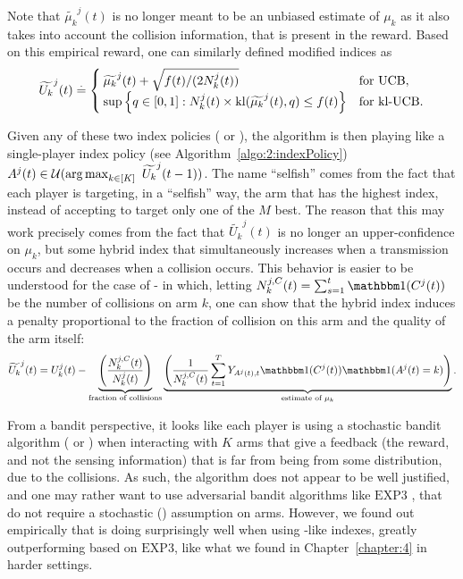 Note that $\widetilde{\mu_k}^j(t)$ is no longer meant to be an unbiased estimate of $\mu_k$ as it also takes into account the collision information, that is present in the reward. Based on this empirical reward, one can similarly defined modified indices as
%
\begin{equation}\label{eq:5:indexTilde}
  \widetilde{U_k}^j(t) \overset{.}{=} \begin{cases}
      \widetilde{\mu_k}^j(t)  + \sqrt{  f(t) / (2N_k^j(t))}
      &\text{for } \mathrm{UCB}, \\
      \sup\left\{ q \in [0, 1]: N_k^j(t)\times \mathrm{kl}(\widetilde{\mu_k}^j(t), q) \leq f(t) \right\}
      &\text{for } \mathrm{kl}\text{-}\mathrm{UCB}.
  \end{cases}
\end{equation}

Given any of these two index policies (\UCB{} or \klUCB), the \Selfish{} algorithm is then playing like a single-player index policy (see Algorithm~\ref{algo:2:indexPolicy})
$A^j(t) \in \cU(\argmax_{ k \in [K]} \ \widetilde{U_k}^j(t-1))$.
The name ``selfish'' comes from the fact that each player is targeting, in a ``selfish'' way, the arm that has the highest index, instead of accepting to target only one of the $M$ best.
The reason that this may work precisely comes from the fact that $\widetilde{U_k}^j(t)$ is no longer an upper-confidence on $\mu_k$,
but some hybrid index that simultaneously increases when a transmission occurs and decreases when a collision occurs.
%
This behavior is easier to be understood for the case of \Selfish-\UCB{} in which, letting $N_k^{j,C}(t) = \sum_{s=1}^t \indic(C^j(t))$ be the number of collisions on arm $k$, one can show that the hybrid \Selfish{} index induces a penalty proportional to the fraction of collision on this arm and the quality of the arm itself:
\begin{equation}
  \widetilde{U_k}^j(t) = U_k^j(t) -
  \underbrace{\left(\frac{N_k^{j,C}(t)}{N_k^j(t)}\right)}_{\text{fraction of collisions}}
  \underbrace{\left(\frac{1}{N_k^{j,C}(t)}\sum_{t=1}^{T}Y_{A^j(t),t} \indic(C^j(t)) \indic(A^j(t) = k)\right)}_{\text{estimate of } \mu_k }.
\end{equation}

From a bandit perspective, it looks like each player is using a stochastic bandit algorithm (\UCB{} or \klUCB) when interacting with $K$ arms that give a feedback (the reward, and not the sensing information) that is far from being \iid{} from some distribution, due to the collisions.
%
As such, the algorithm does not appear to be well justified, and one may rather want to use adversarial bandit algorithms like $\mathrm{EXP3}$ \citep{Auer02NonStochastic}, that do not require a stochastic (\iid) assumption on arms.
%
However, we found out empirically that \Selfish{} is doing surprisingly well when using \UCB-like indexes, greatly outperforming \Selfish{} based on $\mathrm{EXP3}$,
like what we found in Chapter~\ref{chapter:4} in harder settings.

